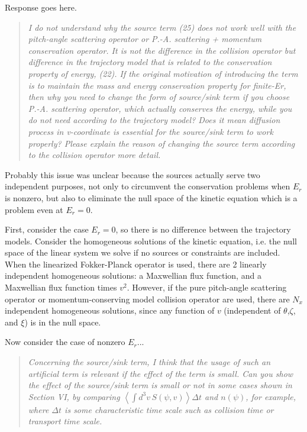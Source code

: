 \documentclass[11pt]{article}
\newcommand{\todo}[1]{{\color{red}#1}}
\newenvironment{referee}{\begin{quote}\it\color{Blue}}{\end{quote}}
\begin{document}
\todo{Response goes here.}

\begin{referee}
I do not understand why the source term (25) does not work well with the pitch-angle scattering
operator or P.-A. scattering + momentum conservation operator. It is not the difference in the
collision operator but difference in the trajectory model that is related to the conservation
property of energy, (22). If the original motivation of introducing the term is to maintain the
mass and energy conservation property for finite-Er, then why you need to change the form of
source/sink term if you choose P.-A. scattering operator, which actually conserves the energy,
while you do not need according to the trajectory model? Does it mean diffusion process in
v-coordinate is essential for the source/sink term to work properly?
Please explain the reason of changing the source term according to the collision operator more
detail.
\end{referee}

Probably this issue was unclear because the sources actually serve two independent purposes,
not only to circumvent the conservation problems when $E_r$ is nonzero, but also to eliminate the null
space of the kinetic equation which is a problem even at $E_r=0$.

First, consider the case $E_r=0$, so there is no difference between the trajectory models.
Consider the homogeneous solutions of the kinetic equation, i.e. the null space of the linear system
we solve if no sources or constraints are included. 
When the linearized Fokker-Planck operator is used, 
there are 2 linearly independent homogeneous solutions:
a Maxwellian flux function,
and a Maxwellian flux function times $v^2$.
However, if the pure pitch-angle scattering operator or momentum-conserving model
collision operator are used, there are $N_x$ independent homogeneous solutions,
since any function of $v$ (independent of $\theta$,$\zeta$, and $\xi$)
is in the null space. 

\todo{Now consider the case of nonzero $E_r$...}

\begin{referee}
Concerning the source/sink term, I think that the usage of such an artificial term is relevant if
the effect of the term is small. Can you show the effect of the source/sink term is small or not in
some cases shown in Section VI, by comparing $\left< \int d^3v\, S(\psi,v) \right> \Delta t$ and $n(\psi)$, for example, where
$\Delta t$ is some characteristic time scale such as collision time or transport time scale.
\end{referee}
\end{document}

